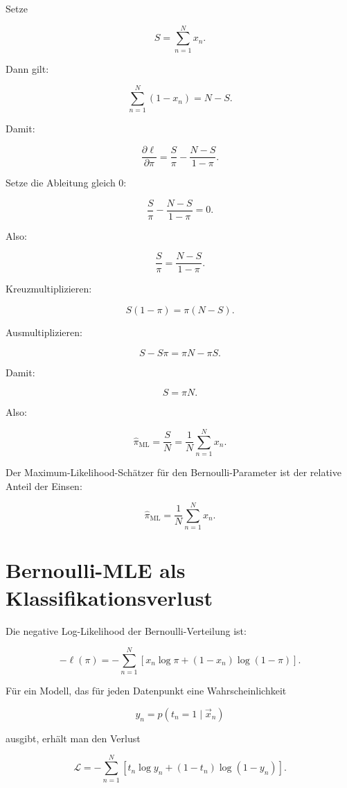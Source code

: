 Setze

\[
    S
    =
    \sum_{n=1}^{N}
    x_n.
\]

Dann gilt:

\[
    \sum_{n=1}^{N}
    (1-x_n)
    =
    N-S.
\]

Damit:

\[
    \frac{\partial \ell}{\partial \pi}
    =
    \frac{S}{\pi}
    -
    \frac{N-S}{1-\pi}.
\]

Setze die Ableitung gleich \(0\):

\[
    \frac{S}{\pi}
    -
    \frac{N-S}{1-\pi}
    =
    0.
\]

Also:

\[
    \frac{S}{\pi}
    =
    \frac{N-S}{1-\pi}.
\]

Kreuzmultiplizieren:

\[
    S(1-\pi)
    =
    \pi(N-S).
\]

Ausmultiplizieren:

\[
    S - S\pi
    =
    \pi N - \pi S.
\]

Damit:

\[
    S = \pi N.
\]

Also:

\[
    \hat{\pi}_{\mathrm{ML}}
    =
    \frac{S}{N}
    =
    \frac{1}{N}
    \sum_{n=1}^{N}
    x_n.
\]

\begin{conceptbox}
Der Maximum-Likelihood-Schätzer für den Bernoulli-Parameter ist der relative Anteil der Einsen:

\[
    \hat{\pi}_{\mathrm{ML}}
    =
    \frac{1}{N}
    \sum_{n=1}^{N}
    x_n.
\]
\end{conceptbox}

\section{Bernoulli-MLE als Klassifikationsverlust}

Die negative Log-Likelihood der Bernoulli-Verteilung ist:

\[
    -\ell(\pi)
    =
    -\sum_{n=1}^{N}
    \left[
        x_n \log \pi
        +
        (1-x_n)\log(1-\pi)
    \right].
\]

Für ein Modell, das für jeden Datenpunkt eine Wahrscheinlichkeit

\[
    y_n = p(t_n=1 \mid \vec{x}_n)
\]

ausgibt, erhält man den Verlust

\[
    \mathcal{L}
    =
    -\sum_{n=1}^{N}
    \left[
        t_n \log y_n
        +
        (1-t_n)\log(1-y_n)
    \right].
\]

